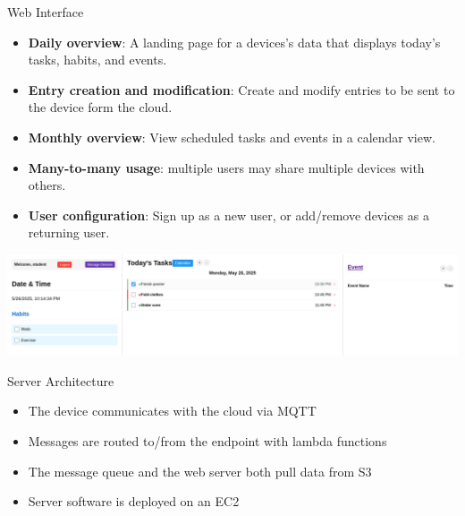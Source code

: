 \documentclass[final]{beamer}
\newlength{\colwidth}
\begin{document}
\begin{frame}[t]
\begin{columns}[t]
\begin{column}{\colwidth}
      \begin{block}{Web Interface}
        \begin{itemize}
          \item \textbf{Daily overview}: A landing page for a devices's data 
            that displays today's tasks, habits, and events.
          \item \textbf{Entry creation and modification}: Create and modify 
            entries to be sent to the device form the cloud.
          \item \textbf{Monthly overview}: View scheduled tasks and events in a
            calendar view.
          \item \textbf{Many-to-many usage}: multiple users may share multiple
            devices with others.
          \item \textbf{User configuration}: Sign up as a new user, or
            add/remove devices as a returning user.
        \end{itemize}
        \includegraphics[width = \textwidth]{web_mainview.png}
      \end{block}

      \begin{block}{Server Architecture}

        \begin{itemize}
          \item The device communicates with the cloud via MQTT
          \item Messages are routed to/from the endpoint with lambda functions
          \item The message queue and the web server both pull data from S3
          \item Server software is deployed on an EC2 
        \end{itemize}


\end{block}
\end{column}
\end{columns}
\end{frame}
\end{document}
